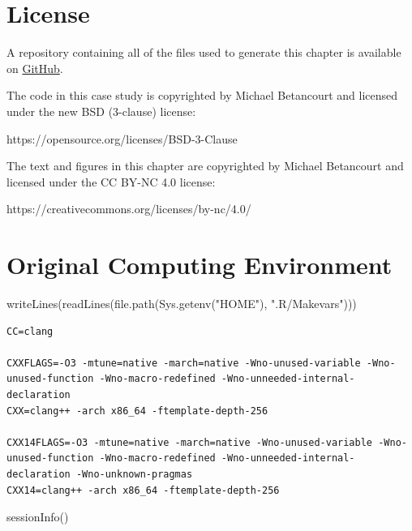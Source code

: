 \documentclass[
  letterpaper,
  DIV=11,
  numbers=noendperiod]{scrartcl}
\newenvironment{Shaded}{\begin{snugshade}}{\end{snugshade}}
\newcommand{\FunctionTok}[1]{\textcolor[rgb]{0.28,0.35,0.67}{#1}}
\newcommand{\NormalTok}[1]{\textcolor[rgb]{0.00,0.23,0.31}{#1}}
\newcommand{\StringTok}[1]{\textcolor[rgb]{0.13,0.47,0.30}{#1}}
\begin{document}
\section*{License}\label{license}

A repository containing all of the files used to generate this chapter
is available on
\href{https://github.com/betanalpha/quarto_chapters/tree/main/case_studies/customer_conversion}{GitHub}.

The code in this case study is copyrighted by Michael Betancourt and
licensed under the new BSD (3-clause) license:

https://opensource.org/licenses/BSD-3-Clause

The text and figures in this chapter are copyrighted by Michael
Betancourt and licensed under the CC BY-NC 4.0 license:

https://creativecommons.org/licenses/by-nc/4.0/

\section*{Original Computing
Environment}\label{original-computing-environment}

\begin{Shaded}
\begin{Highlighting}[]
\FunctionTok{writeLines}\NormalTok{(}\FunctionTok{readLines}\NormalTok{(}\FunctionTok{file.path}\NormalTok{(}\FunctionTok{Sys.getenv}\NormalTok{(}\StringTok{"HOME"}\NormalTok{), }\StringTok{".R/Makevars"}\NormalTok{)))}
\end{Highlighting}
\end{Shaded}

\begin{verbatim}
CC=clang

CXXFLAGS=-O3 -mtune=native -march=native -Wno-unused-variable -Wno-unused-function -Wno-macro-redefined -Wno-unneeded-internal-declaration
CXX=clang++ -arch x86_64 -ftemplate-depth-256

CXX14FLAGS=-O3 -mtune=native -march=native -Wno-unused-variable -Wno-unused-function -Wno-macro-redefined -Wno-unneeded-internal-declaration -Wno-unknown-pragmas
CXX14=clang++ -arch x86_64 -ftemplate-depth-256
\end{verbatim}

\begin{Shaded}
\begin{Highlighting}[]
\FunctionTok{sessionInfo}\NormalTok{()}
\end{Highlighting}
\end{Shaded}
\end{document}
